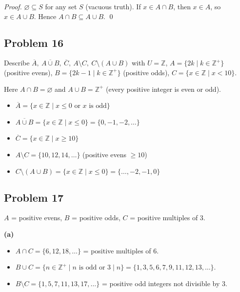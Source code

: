 \textit{Proof.} $\varnothing \subseteq S$ for any set $S$ (vacuous truth). If $x \in A \cap B$, then $x \in A$, so $x \in A \cup B$. Hence $A \cap B \subseteq A \cup B$. \qed

\subsection*{Problem 16}
Describe $\overline{A},\ \overline{A\cup B},\ \overline{C},\ A\setminus C,\ C\setminus(A\cup B)$ with $U = \mathbb{Z}$, $A = \{2k \mid k \in \mathbb{Z}^+\}$ (positive evens), $B = \{2k-1 \mid k \in \mathbb{Z}^+\}$ (positive odds), $C = \{x \in \mathbb{Z} \mid x < 10\}$.

Here $A \cap B = \varnothing$ and $A \cup B = \mathbb{Z}^+$ (every positive integer is even or odd).
\begin{itemize}
  \item $\boxed{\overline{A} = \{x \in \mathbb{Z} \mid x \le 0 \text{ or } x \text{ is odd}\}}$
  \item $\boxed{\overline{A \cup B} = \{x \in \mathbb{Z} \mid x \le 0\} = \{0,-1,-2,\ldots\}}$
  \item $\boxed{\overline{C} = \{x \in \mathbb{Z} \mid x \ge 10\}}$
  \item $\boxed{A \setminus C = \{10, 12, 14, \ldots\}}$ \quad (positive evens $\ge 10$)
  \item $\boxed{C \setminus (A \cup B) = \{x \in \mathbb{Z} \mid x \le 0\} = \{\ldots, -2, -1, 0\}}$
\end{itemize}

\subsection*{Problem 17}
$A$ = positive evens, $B$ = positive odds, $C$ = positive multiples of 3.

\textbf{(a)}
\begin{itemize}
  \item $A \cap C = \{6, 12, 18, \ldots\}$ = positive multiples of 6.
  \item $B \cup C = \{n \in \mathbb{Z}^+ \mid n \text{ is odd or } 3 \mid n\} = \{1,3,5,6,7,9,11,12,13,\ldots\}$.
  \item $B \setminus C = \{1, 5, 7, 11, 13, 17, \ldots\}$ = positive odd integers not divisible by 3.
\end{itemize}

